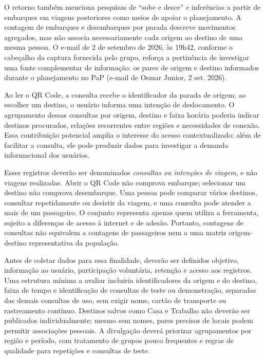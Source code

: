 O retorno também menciona pesquisas de ``sobe e desce'' e inferências a partir de embarques em viagens posteriores como meios de apoiar o planejamento. A contagem de embarques e desembarques por parada descreve movimentos agregados, mas não associa necessariamente cada origem ao destino de uma mesma pessoa. O e-mail de 2 de setembro de 2026, às 19h42, conforme o cabeçalho da captura fornecida pelo grupo, reforça a pertinência de investigar uma fonte complementar de informação: os pares de origem e destino informados durante o planejamento no PaP (e-mail de Osmar Junior, 2 set. 2026).

Ao ler o QR Code, a consulta recebe o identificador da parada de origem; ao escolher um destino, o usuário informa uma intenção de deslocamento. O agrupamento dessas consultas por origem, destino e faixa horária poderia indicar destinos procurados, relações recorrentes entre regiões e necessidades de conexão. Essa contribuição potencial amplia o interesse do acesso contextualizado: além de facilitar a consulta, ele pode produzir dados para investigar a demanda informacional dos usuários.

Esses registros deverão ser denominados \textit{consultas ou intenções de viagem}, e não viagens realizadas. Abrir o QR Code não comprova embarque; selecionar um destino não comprova desembarque. Uma pessoa pode comparar vários destinos, consultar repetidamente ou desistir da viagem, e uma consulta pode atender a mais de um passageiro. O conjunto representa apenas quem utiliza a ferramenta, sujeito a diferenças de acesso à internet e de adesão. Portanto, contagens de consultas não equivalem a contagens de passageiros nem a uma matriz origem-destino representativa da população.

Antes de coletar dados para essa finalidade, deverão ser definidos objetivo, informação ao usuário, participação voluntária, retenção e acesso aos registros. Uma estrutura mínima a avaliar incluiria identificadores da origem e do destino, faixa de tempo e identificação de consultas de teste ou demonstração, separadas das demais consultas de uso, sem exigir nome, cartão de transporte ou rastreamento contínuo. Destinos salvos como Casa e Trabalho não deverão ser publicados individualmente; mesmo sem nomes, pares precisos de locais podem permitir associações pessoais. A divulgação deverá priorizar agrupamentos por região e período, com tratamento de grupos pouco frequentes e regras de qualidade para repetições e consultas de teste.
